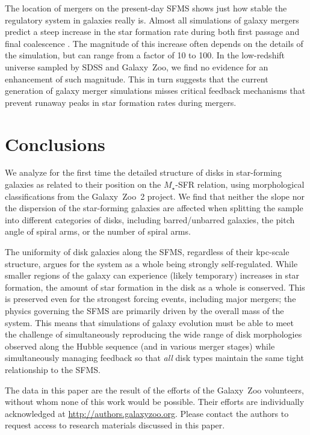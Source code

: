 \documentclass{emulateapj}
\begin{document}
The location of mergers on the present-day SFMS shows just how stable the regulatory system in galaxies really is. Almost all simulations of galaxy mergers predict a steep increase in the star formation rate during both first passage and final coalescence \citep[eg,][]{hop08}. The magnitude of this increase often depends on the details of the simulation, but can range from a factor of 10 to 100. In the low-redshift universe sampled by SDSS and Galaxy~Zoo, we find no evidence for an enhancement of such magnitude. This in turn suggests that the current generation of galaxy merger simulations misses critical feedback mechanisms that prevent runaway peaks in star formation rates during mergers.

\section{Conclusions}

We analyze for the first time the detailed structure of disks in star-forming galaxies as related to their position on the $M_\star$-SFR relation, using morphological classifications from the Galaxy~Zoo~2 project. We find that neither the slope nor the dispersion of the star-forming galaxies are affected when splitting the sample into different categories of disks, including barred/unbarred galaxies, the pitch angle of spiral arms, or the number of spiral arms. 

The uniformity of disk galaxies along the SFMS, regardless of their kpc-scale structure, argues for the system as a whole being strongly self-regulated. While smaller regions of the galaxy can experience (likely temporary) increases in star formation, the amount of star formation in the disk as a whole is conserved. This is preserved even for the strongest forcing events, including major mergers; the physics governing the SFMS are primarily driven by the overall mass of the system. This means that simulations of galaxy evolution must be able to meet the challenge of simultaneously reproducing the wide range of disk morphologies observed along the Hubble sequence (and in various merger stages) while simultaneously managing feedback so that \emph{all} disk types maintain the same tight relationship to the SFMS.


\acknowledgments

The data in this paper are the result of the efforts of the Galaxy~Zoo volunteers, without whom none of this work would be possible. Their efforts are individually acknowledged at \url{http://authors.galaxyzoo.org}. Please contact the authors to request access to research materials discussed in this paper. 
\end{document}
